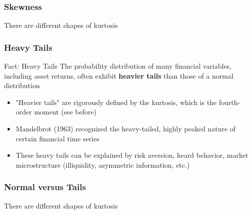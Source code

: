 \documentclass{beamer}
\begin{document}
\begin{frame}
  \frametitle{Skewness}
  There are different shapes of kurtosis 
\end{frame}



\begin{frame}
  \frametitle{Heavy Tails}
  \begin{exampleblock}{Fact: Heavy Tails}
    The probability distribution of many financial variables, including asset returns, often exhibit \textbf{heavier tails} than those of a normal distribution
  \end{exampleblock}

  \begin{itemize}
  \item "Heavier tails" are rigorously defined by the kurtosis, which is the fourth-order moment (see before)
  \item Mandelbrot (1963) recognized the heavy-tailed, highly peaked nature of certain financial time series
  \item These heavy tails can be explained by risk aversion, heard behavior, market microstructure (illiquidity, asymmetric information, etc.)
  \end{itemize}    
\end{frame}



\begin{frame}
  \frametitle{Normal versus Tails}
  There are different shapes of kurtosis 

\end{frame}
\end{document}
